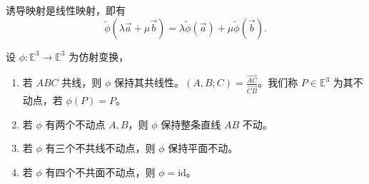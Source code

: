 \documentclass[lang=cn,10pt,thmcnt=section]{elegantbook}
\begin{document}
\begin{theorem}
    诱导映射是线性映射，即有
\[
\widetilde{\phi}(\lambda \vec{a} + \mu \vec{b}) = \lambda \widetilde{\phi}(\vec{a}) + \mu \widetilde{\phi}(\vec{b}).
\]
\end{theorem}
\begin{lemma}
    设 $\phi: \mathbb{E}^3 \rightarrow \mathbb{E}^3$ 为仿射变换，
    \begin{enumerate}
        \item 若 $ABC$ 共线，则 $\phi$ 保持其共线性。$(A, B; C) = \frac{\overrightarrow{AC}}{\overrightarrow{CB}}$。我们称 $P \in \mathbb{E}^3$ 为其不动点，若 $\phi(P) = P$。
        \item 若 $\phi$ 有两个不动点 $A, B$，则 $\phi$ 保持整条直线 $AB$ 不动。
        \item 若 $\phi$ 有三个不共线不动点，则 $\phi$ 保持平面不动。
        \item 若 $\phi$ 有四个不共面不动点，则 $\phi = \text{id}$。
    \end{enumerate}
\end{lemma}
\end{document}
